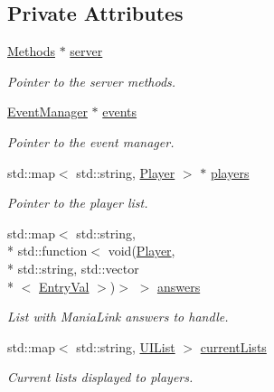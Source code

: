 \subsection*{Private Attributes}
\begin{DoxyCompactItemize}
\item 
\hypertarget{classUIManager_a33db2c26db770d39d59625138097cf4b}{\hyperlink{classMethods}{Methods} $\ast$ \hyperlink{classUIManager_a33db2c26db770d39d59625138097cf4b}{server}}\label{classUIManager_a33db2c26db770d39d59625138097cf4b}

\begin{DoxyCompactList}\small\item\em Pointer to the server methods. \end{DoxyCompactList}\item 
\hypertarget{classUIManager_aaa87b49b6a0329d8502cfb8e2ca9ab59}{\hyperlink{classEventManager}{Event\-Manager} $\ast$ \hyperlink{classUIManager_aaa87b49b6a0329d8502cfb8e2ca9ab59}{events}}\label{classUIManager_aaa87b49b6a0329d8502cfb8e2ca9ab59}

\begin{DoxyCompactList}\small\item\em Pointer to the event manager. \end{DoxyCompactList}\item 
\hypertarget{classUIManager_a33c7380de6a617f3e02526a04c5ce726}{std\-::map$<$ std\-::string, \hyperlink{structPlayer}{Player} $>$ $\ast$ \hyperlink{classUIManager_a33c7380de6a617f3e02526a04c5ce726}{players}}\label{classUIManager_a33c7380de6a617f3e02526a04c5ce726}

\begin{DoxyCompactList}\small\item\em Pointer to the player list. \end{DoxyCompactList}\item 
\hypertarget{classUIManager_a06f9c65d5f61810311f6e7cd53bce55f}{std\-::map$<$ std\-::string, \\*
std\-::function$<$ void(\hyperlink{structPlayer}{Player}, \\*
std\-::string, std\-::vector\\*
$<$ \hyperlink{structEntryVal}{Entry\-Val} $>$)$>$ $>$ \hyperlink{classUIManager_a06f9c65d5f61810311f6e7cd53bce55f}{answers}}\label{classUIManager_a06f9c65d5f61810311f6e7cd53bce55f}

\begin{DoxyCompactList}\small\item\em List with Mania\-Link answers to handle. \end{DoxyCompactList}\item 
\hypertarget{classUIManager_a94703fac0de8ee6e8116cd5f9a01b7e2}{std\-::map$<$ std\-::string, \hyperlink{structUIList}{U\-I\-List} $>$ \hyperlink{classUIManager_a94703fac0de8ee6e8116cd5f9a01b7e2}{current\-Lists}}\label{classUIManager_a94703fac0de8ee6e8116cd5f9a01b7e2}

\begin{DoxyCompactList}\small\item\em Current lists displayed to players. \end{DoxyCompactList}\end{DoxyCompactItemize}


